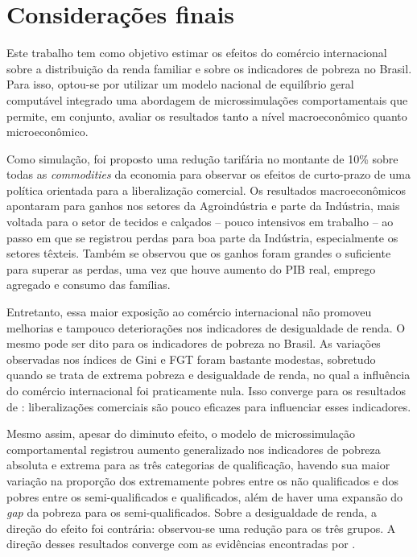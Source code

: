 

\chapter{Considerações finais}

Este trabalho tem como objetivo estimar os efeitos do comércio internacional sobre a distribuição da renda familiar e sobre os indicadores de pobreza no Brasil. Para isso, optou-se por utilizar um modelo nacional de equilíbrio geral computável integrado uma abordagem de microssimulações comportamentais que permite, em conjunto, avaliar os resultados tanto a nível macroeconômico quanto microeconômico.

Como simulação, foi proposto uma redução tarifária no montante de 10\% sobre todas as \textit{commodities} da economia para observar os efeitos de curto-prazo de uma política orientada para a liberalização comercial. Os resultados macroeconômicos apontaram para ganhos nos setores da Agroindústria e parte da Indústria, mais voltada para o setor de tecidos e calçados -- pouco intensivos em trabalho -- ao passo em que se registrou perdas para boa parte da Indústria, especialmente os setores têxteis. Também se observou que os ganhos foram grandes o suficiente para superar as perdas, uma vez que houve aumento do PIB real, emprego agregado e consumo das famílias.

Entretanto, essa maior exposição ao comércio internacional não promoveu melhorias e tampouco deteriorações nos indicadores de desigualdade de renda. O mesmo pode ser dito para os indicadores de pobreza no Brasil. As variações observadas nos índices de Gini e FGT foram bastante modestas, sobretudo quando se trata de extrema pobreza e desigualdade de renda, no qual a influência do comércio internacional foi praticamente nula. Isso converge para os resultados de \textcite{carneiro06}: liberalizações comerciais são pouco eficazes para influenciar esses indicadores.

Mesmo assim, apesar do diminuto efeito, o modelo de microssimulação comportamental registrou aumento generalizado nos indicadores de pobreza absoluta e extrema para as três categorias de qualificação, havendo sua maior variação na proporção dos extremamente pobres entre os não qualificados e dos pobres entre os semi-qualificados e qualificados, além de haver uma expansão do \textit{gap} da pobreza para os semi-qualificados. Sobre a desigualdade de renda, a direção do efeito foi contrária: observou-se uma redução para os três grupos. A direção desses resultados converge com as evidências encontradas por \textcite{borrazetal12}.

